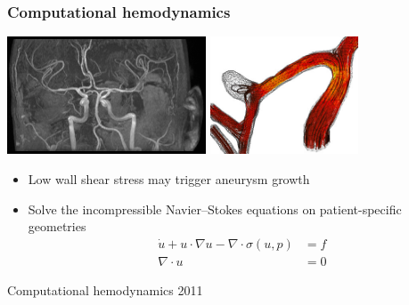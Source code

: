 \begin{frame}[fragile]
  \frametitle{Computational hemodynamics}

  \begin{center}
    \includegraphics[height=3.5cm]{png/circle_of_willis_scan.png} \hspace{0.3cm}
    \includegraphics[height=3.5cm]{png/circle_of_willis_aneurysm.png}
  \end{center}

  \begin{itemize}
  \item
    Low wall shear stress may trigger aneurysm growth
  \item
    Solve the incompressible Navier--Stokes equations on patient-specific geometries
    \begin{displaymath}
      \begin{split}
        \dot{u} + u \cdot \nabla u - \nabla \cdot \sigma(u, p) &= f \\
        \nabla \cdot u &= 0
      \end{split}
    \end{displaymath}
  \end{itemize}

            {Computational hemodynamics}
            {2011}

\end{frame}
